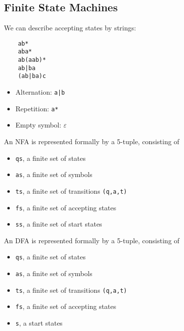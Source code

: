 \documentclass{article}
\begin{document}
\subsection{Finite State Machines}
We can describe accepting states by strings:
\begin{verbatim}
    ab*
    aba*
    ab(aab)*
    ab|ba
    (ab|ba)c
\end{verbatim}
\begin{itemize}
    \item Alternation: \texttt{a|b}
    \item Repetition: \texttt{a*}
    \item Empty symbol: $\varepsilon$
\end{itemize}
\begin{definition}
    An NFA is represented formally by a 5-tuple, consisting of
    \begin{itemize}
        \item \texttt{qs}, a finite set of states
        \item \texttt{as}, a finite set of symbols
        \item \texttt{ts}, a finite set of transitions \texttt{(q,a,t)}
        \item \texttt{fs}, a finite set of accepting states
        \item \texttt{ss}, a finite set of start states
    \end{itemize}
\end{definition}
\begin{definition}
    An DFA is represented formally by a 5-tuple, consisting of
    \begin{itemize}
        \item \texttt{qs}, a finite set of states
        \item \texttt{as}, a finite set of symbols
        \item \texttt{ts}, a finite set of transitions \texttt{(q,a,t)}
        \item \texttt{fs}, a finite set of accepting states
        \item \texttt{s}, a start states
    \end{itemize}
\end{definition}
\end{document}
